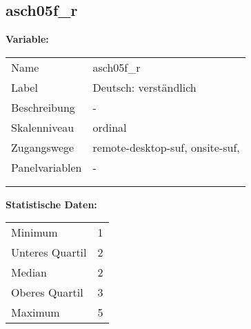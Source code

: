 	
	
	\subsection{asch05f\_r}
	\label{subSection:asch05f_r}

	\noindent\textbf{Variable:}\\
		\begin{tabular}{lL{11.3cm}}
			\label{tableVariable:asch05f_r}
			Name & asch05f\_r \\
			Label & Deutsch: verständlich \\
			Beschreibung & - \\
			Skalenniveau & ordinal \\
			Zugangswege &
				remote-desktop-suf,
				onsite-suf,
 \\
			Panelvariablen & -
			 \\
			 \\
 \\
		\end{tabular}



		\vspace*{1 cm}
		\noindent\textbf{Statistische Daten:}\\
			\begin{tabular}{ll}
				\label{tableStatistics:asch05f_r}
					Minimum & 1 \\
					Unteres Quartil & 2 \\
					Median & 2 \\
					Oberes Quartil & 3 \\
					Maximum & 5 \\
			\end{tabular}



